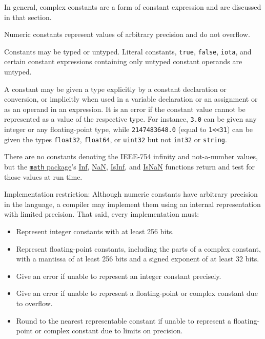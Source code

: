 In general, complex constants are a form of
constant expression and are discussed
in that section.

Numeric constants represent values of arbitrary precision and do not
overflow.

Constants may be typed or untyped. Literal constants,
\texttt{true}, \texttt{false}, \texttt{iota}, and certain
constant expressions containing only
untyped constant operands are untyped.

A constant may be given a type explicitly by a
constant declaration or
conversion, or implicitly when used in a
variable declaration or an
assignment or as an operand in an
expression. It is an error if the constant value
cannot be represented as a value of the respective type. For instance,
\texttt{3.0} can be given any integer or any floating-point type, while
\texttt{2147483648.0} (equal to \texttt{1\textless{}\textless{}31}) can
be given the types \texttt{float32}, \texttt{float64}, or
\texttt{uint32} but not \texttt{int32} or \texttt{string}.

There are no constants denoting the IEEE-754 infinity and not-a-number
values, but the \href{/pkg/math/}{\texttt{math} package}'s
\href{/pkg/math/\#Inf}{Inf}, \href{/pkg/math/\#NaN}{NaN},
\href{/pkg/math/\#IsInf}{IsInf}, and \href{/pkg/math/\#IsNaN}{IsNaN}
functions return and test for those values at run time.

Implementation restriction: Although numeric constants have arbitrary
precision in the language, a compiler may implement them using an
internal representation with limited precision. That said, every
implementation must:

\begin{itemize}
\item
  Represent integer constants with at least 256 bits.
\item
  Represent floating-point constants, including the parts of a complex
  constant, with a mantissa of at least 256 bits and a signed exponent
  of at least 32 bits.
\item
  Give an error if unable to represent an integer constant precisely.
\item
  Give an error if unable to represent a floating-point or complex
  constant due to overflow.
\item
  Round to the nearest representable constant if unable to represent a
  floating-point or complex constant due to limits on precision.
\end{itemize}

